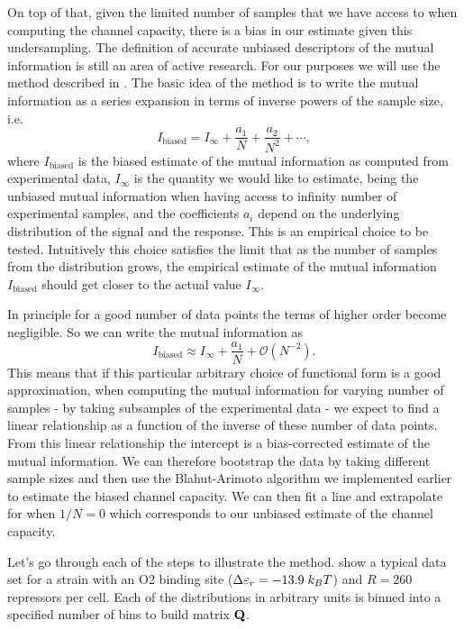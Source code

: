 On top of that, given the limited number of samples that we have access to when
computing the channel capacity, there is a bias in our estimate given this
undersampling. The definition of accurate unbiased descriptors of the mutual
information is still an area of active research. For our purposes we will use
the method described in \cite{Cheong2011a}. The basic idea of the method is to
write the mutual information as a series expansion in terms of inverse powers
of the sample size, i.e.
\begin{equation}
I_{\text{biased}} = I_\infty + \frac{a_1}{N} + \frac{a_2}{N^2} + \cdots,
\end{equation}
where $I_{\text{biased}}$ is the biased estimate of the mutual information as
computed from experimental data, $I_\infty$ is the quantity we would like to
estimate, being the unbiased mutual information when having access to infinity
number of experimental samples, and the coefficients $a_i$ depend on the
underlying distribution of the signal and the response. This is an empirical
choice to be tested. Intuitively this choice satisfies the limit that as the
number of samples from the distribution grows, the empirical estimate of the
mutual information $I_{\text{biased}}$ should get closer to the actual value
$I_\infty$.

In principle for a good number of data points the terms of higher order become
negligible. So we can write the mutual information as
\begin{equation}
I_{\text{biased}} \approx I_\infty + \frac{a_1}{N} + \mathcal{O}(N^{-2}).
\label{seq_mutual_biased}
\end{equation}
This means that if this particular arbitrary choice of functional form is  a
good approximation, when computing the mutual information for varying number of
samples - by taking subsamples of the experimental data - we expect to find a
linear relationship as a function of the inverse of these number of data
points. From this linear relationship the intercept is a bias-corrected
estimate of the mutual information. We can therefore bootstrap the data by
taking different sample sizes and then use the Blahut-Arimoto algorithm we
implemented earlier to estimate the biased channel capacity. We can then fit a
line and extrapolate for when $1/N = 0$ which corresponds to our unbiased
estimate of the channel capacity.

Let's go through each of the steps to illustrate the method.
 show a typical data set for a strain with an O2 binding
site ($\Delta\varepsilon_r = -13.9 \; k_BT$) and $R = 260$ repressors per cell. Each of the
distributions in arbitrary units is binned into a specified number of bins to
build matrix $\mathbf{Q}$.

